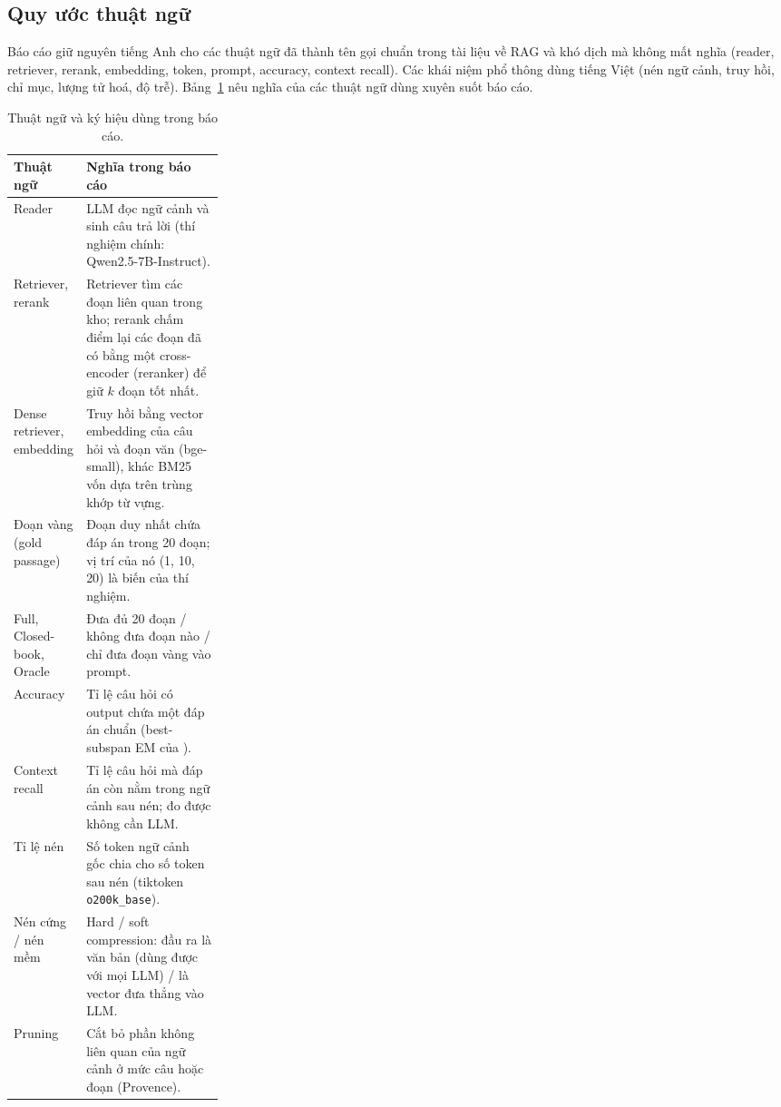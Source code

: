\subsection{Quy ước thuật ngữ}
\label{sec:terms}

Báo cáo giữ nguyên tiếng Anh cho các thuật ngữ đã thành tên gọi chuẩn trong tài liệu về RAG và khó
dịch mà không mất nghĩa (reader, retriever, rerank, embedding, token, prompt, accuracy, context
recall). Các khái niệm phổ thông dùng tiếng Việt (nén ngữ cảnh, truy hồi, chỉ mục, lượng tử hoá, độ
trễ). Bảng~\ref{tab:glossary} nêu nghĩa của các thuật ngữ dùng xuyên suốt báo cáo.

\begin{table}[!ht]
\centering
\caption{Thuật ngữ và ký hiệu dùng trong báo cáo.}
\label{tab:glossary}
\small
\renewcommand{\arraystretch}{1.12}
\begin{tabularx}{\linewidth}{@{}>{\raggedright\arraybackslash}p{0.27\linewidth} X@{}}
\toprule
Thuật ngữ & Nghĩa trong báo cáo \\
\midrule
Reader & LLM đọc ngữ cảnh và sinh câu trả lời (thí nghiệm chính: Qwen2.5-7B-Instruct). \\
Retriever, rerank & Retriever tìm các đoạn liên quan trong kho; rerank chấm điểm lại các đoạn đã có
  bằng một cross-encoder (reranker) để giữ $k$ đoạn tốt nhất. \\
Dense retriever, embedding & Truy hồi bằng vector embedding của câu hỏi và đoạn văn (bge-small),
  khác BM25 vốn dựa trên trùng khớp từ vựng. \\
Đoạn vàng (gold passage) & Đoạn duy nhất chứa đáp án trong 20 đoạn; vị trí của nó (1, 10, 20) là
  biến của thí nghiệm. \\
Full, Closed-book, Oracle & Đưa đủ 20 đoạn / không đưa đoạn nào / chỉ đưa đoạn vàng vào prompt. \\
Accuracy & Tỉ lệ câu hỏi có output chứa một đáp án chuẩn (best-subspan EM của \citet{liu2024lost}). \\
Context recall & Tỉ lệ câu hỏi mà đáp án còn nằm trong ngữ cảnh sau nén; đo được không cần LLM. \\
Tỉ lệ nén & Số token ngữ cảnh gốc chia cho số token sau nén (tiktoken \texttt{o200k\_base}). \\
Nén cứng / nén mềm & Hard / soft compression: đầu ra là văn bản (dùng được với mọi LLM) / là vector
  đưa thẳng vào LLM. \\
Pruning & Cắt bỏ phần không liên quan của ngữ cảnh ở mức câu hoặc đoạn (Provence). \\

\end{tabularx}
\end{table}

